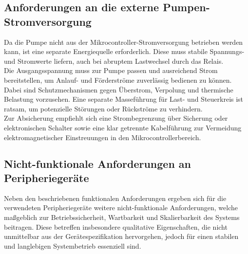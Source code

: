 \subsection{Anforderungen an die externe Pumpen-Stromversorgung}

Da die Pumpe nicht aus der Mikrocontroller-Stromversorgung betrieben werden kann, ist eine separate Energiequelle erforderlich. Diese muss stabile Spannungs- und Stromwerte liefern, auch bei abruptem Lastwechsel durch das Relais.
\\
Die Ausgangsspannung muss zur Pumpe passen und ausreichend Strom bereitstellen, um Anlauf- und Förderströme zuverlässig bedienen zu können. Dabei sind Schutzmechanismen gegen Überstrom, Verpolung und thermische Belastung vorzusehen. Eine separate Masseführung für Last- und Steuerkreis ist ratsam, um potenzielle Störungen oder Rückströme zu verhindern.
\\
Zur Absicherung empfiehlt sich eine Strombegrenzung über Sicherung oder elektronischen Schalter sowie eine klar getrennte Kabelführung zur Vermeidung elektromagnetischer Einstreuungen in den Mikrocontrollerbereich.

\subsection{Nicht-funktionale Anforderungen an Peripheriegeräte}

Neben den beschriebenen funktionalen Anforderungen ergeben sich für die verwendeten Peripheriegeräte weitere nicht-funktionale Anforderungen, welche maßgeblich zur Betriebssicherheit, Wartbarkeit und Skalierbarkeit des Systems beitragen. Diese betreffen insbesondere qualitative Eigenschaften, die nicht unmittelbar aus der Gerätespezifikation hervorgehen, jedoch für einen stabilen und langlebigen Systembetrieb essenziell sind.


